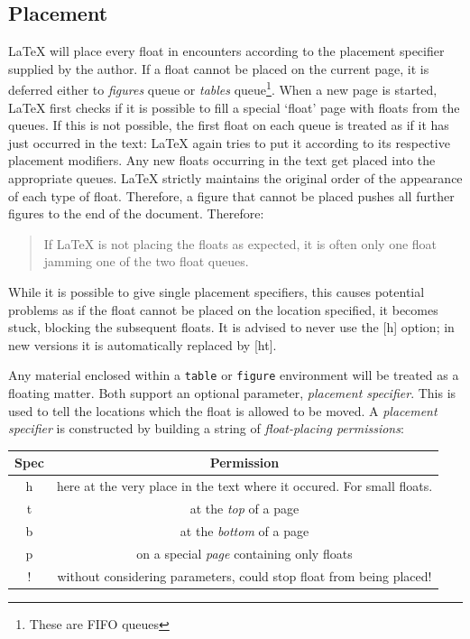 \documentclass[10pt, a4paper]{article}
\begin{document}
\subsection{Placement}
\LaTeX{} will place every float in encounters according to the placement specifier supplied by the author. If a float cannot be placed on the current page, it is deferred either to \emph{figures} queue or \emph{tables} queue\footnote{These are FIFO queues}. When a new page is started, \LaTeX{} first checks if it is possible to fill a special `float' page with floats from the queues. If this is not possible, the first float on each queue is treated as if it has just occurred in the text: \LaTeX{} again tries to put it according to its respective placement modifiers. Any new floats occurring in the text get placed into the appropriate queues. \LaTeX{} strictly maintains the original order of the appearance of each type of float. Therefore, a figure that cannot be placed pushes all further figures to the end of the document. Therefore:\\
\begin{quote}
	If \LaTeX{} is not placing the floats as expected, it is often only one float jamming one of the two float queues. 
	\end{quote}
	
While it is possible to give single placement specifiers, this causes potential problems as if the float cannot be placed on the location specified, it becomes stuck, blocking the subsequent floats. It is advised to never use the [h] option; in new versions it is automatically replaced by [ht]. 

Any material enclosed within a \texttt{table} or \texttt{figure} environment will be treated as a floating matter. Both support an optional parameter, \textsl{placement specifier}. This is used to tell the locations which the float is allowed to be moved. A \textsl{placement specifier} is constructed by building a string of \textsl{float-placing permissions}:\\

\begin{table}[htbp]
	\begin{tabular}{cc}
		Spec & Permission \\ 
		\hline 
		h & here at the very place in the text where it occured. For small floats.\\ 
		t & at the \emph{top} of a page \\ 
		b & at the \emph{bottom} of a page\\ 
		p & on a special \emph{page} containing only floats \\ 
		! & without considering parameters, could stop float from being placed! \\ 
		\hline 
	\end{tabular} 
\end{table}
\end{document}
